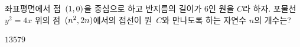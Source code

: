 좌표평면에서 점~$(1{,}\mkern3mu\mathopen{}0)$을 중심으로 하고 반지름의 길이가 $6$인 원을 $C$라 하자. 포물선~$y^2=4x$ 위의 점~$(n^2{,}\mkern3mu\mathopen{}2n)$에서의 접선이 원~$C$와 만나도록 하는 자연수 $n$의 개수는?
\begin{choices32}{$1$}{$3$}{$5$}{$7$}{$9$}\end{choices32}
